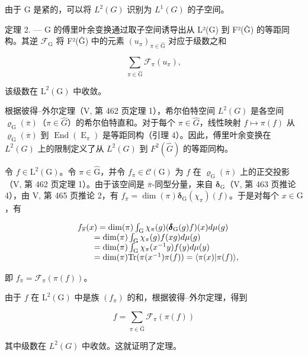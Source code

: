 由于 G 是紧的，可以将 \(L^{2}(G)\) 识别为 \(L^{1}(G)\) 的子空间。

定理 2. --- G 的傅里叶余变换通过取子空间诱导出从 L²(G) 到 F²(Ĝ) 的等距同构。其逆 \(\mathcal{F}_{\mathrm{G}}\) 将 F²(Ĝ) 中的元素 \((u_{\pi})_{\pi \in \widehat{\mathrm{G}}}\) 对应于级数之和

\[
\sum_ {\pi \in \widehat {\mathrm{G}}} \mathcal {F} _ {\pi} (u _ {\pi}),
\]

该级数在 \(\mathrm{L}^2 (\mathrm{G})\) 中收敛。

根据彼得–外尔定理（V, 第 462 页定理 1），希尔伯特空间 \(L^{2}(G)\) 是各空间 \(\varrho_{\mathrm{G}}(\overline{\pi})\)（\(\pi \in \widehat{G}\)）的希尔伯特直和。对于每个 \(\pi \in \widehat{G}\)，线性映射 \(f \mapsto \pi(f)\) 从 \(\varrho_{\mathrm{G}}(\overline{\pi})\) 到 \(\operatorname{End}(\operatorname{E}_{\pi})\) 是等距同构（引理 4）。因此，傅里叶余变换在 \(L^{2}(G)\) 上的限制定义了从 \(L^{2}(G)\) 到 \(F^{2}(\widehat{G})\) 的等距同构。

令 \(f \in \mathrm{L}^2(\mathrm{G})\)。令 \(\pi \in \widehat{\mathrm{G}}\)，并令 \(f_{\overline{\pi}} \in \mathcal{C}(\mathrm{G})\) 为 \(f\) 在 \(\varrho_{\mathrm{G}}(\overline{\pi})\) 上的正交投影（V, 第 462 页定理 1）。由于该空间是 \(\overline{\pi}\)-同型分量，来自 \(\pmb{\delta}_{\mathrm{G}}\)（V, 第 463 页推论 4），由 V, 第 465 页推论 2，有 \(f_{\overline{\pi}} = \dim(\pi)\pmb{\delta}_{\mathrm{G}}(\chi_{\pi})(f)\)。于是对每个 \(x \in \mathrm{G}\)，有

\[
\begin{array}{r l} & {f _ {\overline {{\pi}}} (x) = \dim (\pi) \int_ {\mathrm{G}} \chi_ {\pi} (g) (\pmb {\delta} _ {\mathrm{G}} (g) f) (x) d \mu (g)} \\ & {\qquad = \dim (\pi) \int_ {\mathrm{G}} \chi_ {\pi} (g) f (x g) d \mu (g)} \\ & {\qquad = \dim (\pi) \int_ {\mathrm{G}} \chi_ {\pi} (x ^ {- 1} y) f (y) d \mu (y)} \\ & {\qquad = \dim (\pi) \mathrm{Tr} (\pi (x ^ {- 1}) \pi (f)) = \langle \pi (x) | \pi (f) \rangle ,} \end{array}
\]

即 \(f_{\overline{\pi}} = \mathcal{F}_{\pi}(\pi(f))\)。

由于 \(f\) 在 \(\mathrm{L}^2 (\mathrm{G})\) 中是族 \((f_{\overline{\pi}})\) 的和，根据彼得–外尔定理，得到

\[
f = \sum_ {\pi \in \widehat {\mathrm{G}}} \mathcal {F} _ {\pi} (\pi (f))
\]

其中级数在 \(L^{2}(G)\) 中收敛。这就证明了定理。

